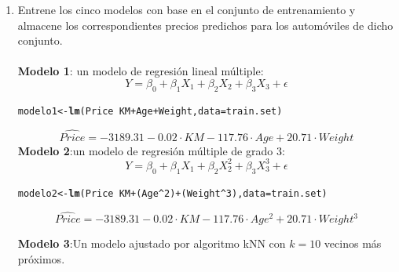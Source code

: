 \documentclass[11pt,letterpaper]{article}\usepackage[]{graphicx}\usepackage[]{color}
\makeatletter
\newcommand{\hlnum}[1]{\textcolor[rgb]{0.686,0.059,0.569}{#1}}%
\newcommand{\hlopt}[1]{\textcolor[rgb]{0,0,0}{#1}}%
\newcommand{\hlstd}[1]{\textcolor[rgb]{0.345,0.345,0.345}{#1}}%
\newcommand{\hlkwb}[1]{\textcolor[rgb]{0.69,0.353,0.396}{#1}}%
\newcommand{\hlkwc}[1]{\textcolor[rgb]{0.333,0.667,0.333}{#1}}%
\newcommand{\hlkwd}[1]{\textcolor[rgb]{0.737,0.353,0.396}{\textbf{#1}}}%
\newenvironment{kframe}{%
 \def\at@end@of@kframe{}%
 \ifinner\ifhmode%
  \def\at@end@of@kframe{\end{minipage}}%
  \begin{minipage}{\columnwidth}%
 \fi\fi%
 \def\FrameCommand##1{\hskip\@totalleftmargin \hskip-\fboxsep
 \colorbox{shadecolor}{##1}\hskip-\fboxsep
     \hskip-\linewidth \hskip-\@totalleftmargin \hskip\columnwidth}%
 \MakeFramed {\advance\hsize-\width
   \@totalleftmargin\z@ \linewidth\hsize
   \@setminipage}}%
 {\par\unskip\endMakeFramed%
 \at@end@of@kframe}
\newenvironment{knitrout}{}{} %
\makeatother
\begin{document}
\begin{enumerate}
    \item Entrene los cinco modelos con base en el conjunto de entrenamiento y almacene los correspondientes precios predichos para los automóviles de dicho conjunto.
    \\ \\
    \textbf{Modelo 1}: un modelo de regresión lineal múltiple:
    \[Y= \beta_0 + \beta_1X_1 + \beta_2X_2 + \beta_3X_3 + \epsilon\]
\begin{knitrout}
\color{fgcolor}\begin{kframe}
\begin{alltt}
\hlstd{modelo1}\hlkwb{<-}\hlkwd{lm}\hlstd{(Price}\hlopt{~}\hlstd{KM}\hlopt{+}\hlstd{Age}\hlopt{+}\hlstd{Weight,}\hlkwc{data}\hlstd{=train.set)}
\end{alltt}
\end{kframe}
\end{knitrout}
\[\widehat{Price}= -3189.31 -0.02 \cdot KM-117.76 \cdot Age + 20.71 \cdot Weight\]
    \textbf{Modelo 2}:un modelo de regresión múltiple de grado 3:
    \[Y= \beta_0 + \beta_1X_1 + \beta_2X_2^2 + \beta_3X_3^3 + \epsilon\]
\begin{knitrout}
\color{fgcolor}\begin{kframe}
\begin{alltt}
\hlstd{modelo2}\hlkwb{<-}\hlkwd{lm}\hlstd{(Price}\hlopt{~}\hlstd{KM}\hlopt{+}\hlstd{(Age}\hlopt{^}\hlnum{2}\hlstd{)}\hlopt{+}\hlstd{(Weight}\hlopt{^}\hlnum{3}\hlstd{),}\hlkwc{data}\hlstd{=train.set)}
\end{alltt}
\end{kframe}
\end{knitrout}
\[\widehat{Price}= -3189.31 -0.02 \cdot KM-117.76 \cdot Age^2 + 20.71 \cdot Weight^3\]

    \textbf{Modelo 3}:Un modelo ajustado por algoritmo kNN con $k=10$ vecinos más próximos.
    

\end{enumerate}
\end{document}
